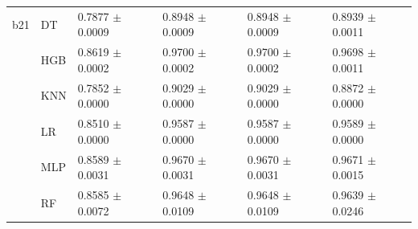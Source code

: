 \begin{tabular}{ll llll}
\midrule
b21 & DT & 0.7877 $\pm$ 0.0009 & 0.8948 $\pm$ 0.0009 & 0.8948 $\pm$ 0.0009 & 0.8939 $\pm$ 0.0011\\
 & HGB & 0.8619 $\pm$ 0.0002 & 0.9700 $\pm$ 0.0002 & 0.9700 $\pm$ 0.0002 & 0.9698 $\pm$ 0.0011\\
 & KNN & 0.7852 $\pm$ 0.0000 & 0.9029 $\pm$ 0.0000 & 0.9029 $\pm$ 0.0000 & 0.8872 $\pm$ 0.0000\\
 & LR & 0.8510 $\pm$ 0.0000 & 0.9587 $\pm$ 0.0000 & 0.9587 $\pm$ 0.0000 & 0.9589 $\pm$ 0.0000\\
 & MLP & 0.8589 $\pm$ 0.0031 & 0.9670 $\pm$ 0.0031 & 0.9670 $\pm$ 0.0031 & 0.9671 $\pm$ 0.0015\\
 & RF & 0.8585 $\pm$ 0.0072 & 0.9648 $\pm$ 0.0109 & 0.9648 $\pm$ 0.0109 & 0.9639 $\pm$ 0.0246\\
\bottomrule
\end{tabular}
